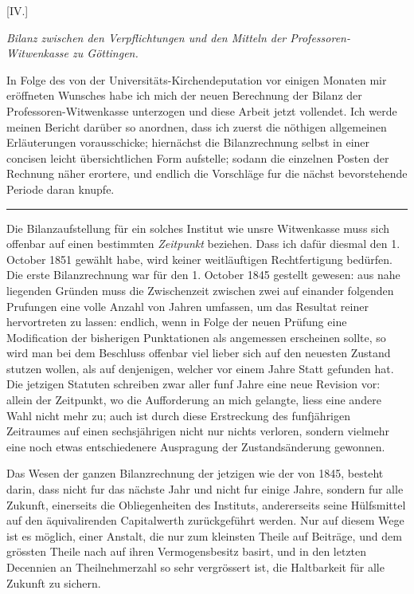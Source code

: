 \begin{center}
[IV.]\par\medskip
\textit{Bilanz zwischen den Verpflichtungen und den Mitteln der Professoren-Witwenkasse zu Göttingen.}
\end{center}
\noindent\hspace*{\parindent}In Folge des von der Universitäts-Kirchendeputation vor einigen Monaten mir eröffneten Wunsches habe ich mich der neuen Berechnung der Bilanz der Professoren-Witwenkasse unterzogen und diese Arbeit jetzt vollendet. Ich werde meinen Bericht darüber so anordnen, dass ich zuerst die nöthigen allgemeinen Erläuterungen vorausschicke; hiernächst die Bilanzrechnung selbst in einer concisen leicht übersichtlichen Form aufstelle; sodann die einzelnen Posten der Rechnung näher erortere, und endlich die Vorschläge fur die nächst bevorstehende Periode daran knupfe.
\begin{center}\rule{.26\textwidth}{.3pt}\end{center}
\noindent\hspace*{\parindent}Die Bilanzaufstellung für ein solches Institut wie unsre Witwenkasse muss sich offenbar auf einen bestimmten \textit{Zeitpunkt} beziehen. Dass ich dafür diesmal den 1. October 1851 gewählt habe, wird keiner weitläuftigen Rechtfertigung bedürfen. Die erste Bilanzrechnung war für den 1. October 1845 gestellt gewesen: aus nahe liegenden Gründen muss die Zwischenzeit zwischen zwei auf einander folgenden Prufungen eine volle Anzahl von Jahren umfassen, um das Resultat reiner hervortreten zu lassen: endlich, wenn in Folge der neuen Prüfung eine Modification der bisherigen Punktationen als angemessen erscheinen sollte, so wird man bei dem Beschluss offenbar viel lieber sich auf den neuesten Zustand stutzen wollen, als auf denjenigen, welcher vor einem Jahre Statt gefunden hat. Die jetzigen Statuten schreiben zwar aller funf Jahre eine neue Revision vor: allein der Zeitpunkt, wo die Aufforderung an mich gelangte, liess eine andere Wahl nicht mehr zu; auch ist durch diese Erstreckung des funfjährigen Zeitraumes auf einen sechsjährigen nicht nur nichts verloren, sondern vielmehr eine noch etwas entschiedenere Auspragung der Zustandsänderung gewonnen.

Das Wesen der ganzen Bilanzrechnung der jetzigen wie der von 1845, besteht darin, dass nicht fur das nächste Jahr und nicht fur einige Jahre, sondern fur alle Zukunft, einerseits die Obliegenheiten des Instituts, andererseits seine Hülfsmittel auf den äquivalirenden Capitalwerth zurückgeführt werden. Nur auf diesem Wege ist es möglich, einer Anstalt, die nur zum kleinsten Theile auf Beiträge, und dem grössten Theile nach auf ihren Vermogensbesitz basirt, und in den letzten Decennien an Theilnehmerzahl so sehr vergrössert ist, die Haltbarkeit für alle Zukunft zu sichern.


